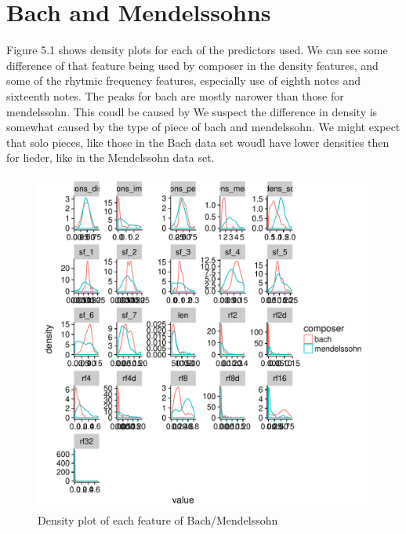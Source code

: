 \documentclass[12pt,twoside]{reedthesis}
\theoremstyle{definition}
\theoremstyle{definition}
\theoremstyle{definition}
\theoremstyle{remark}
\begin{document}
\section{Bach and Mendelssohns}\label{bach-and-mendelssohns}

Figure 5.1 shows density plots for each of the predictors used. We can
see some difference of that feature being used by composer in the
density features, and some of the rhytmic frequency features, especially
use of eighth notes and sixteenth notes. The peaks for bach are mostly
narower than those for mendelssohn. This coudl be caused by We suspect
the difference in density is somewhat caused by the type of piece of
bach and mendelssohn. We might expect that solo pieces, like those in
the Bach data set woudl have lower densities then for lieder, like in
the Mendelssohn data set.
\begin{figure}[H]
\centering
\includegraphics[scale = .5]{images/distribution_b.pdf}
\caption{Density plot of each feature of Bach/Mendelssohn}
\label{subd}
\end{figure}
\end{document}
